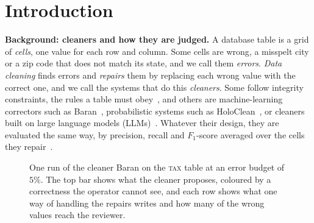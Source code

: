 \documentclass[sigconf, nonacm, balance=false]{acmart}
\theoremstyle{remark}
\begin{document}
\maketitle

\vldbtopmatter

\section{Introduction}
\label{sec:intro}

\textbf{Background: cleaners and how they are judged.} A database table is a grid of
\emph{cells}, one value for each row and column. Some cells are wrong, a misspelt city
or a zip code that does not match its state, and we call them \emph{errors}.
\emph{Data cleaning} finds errors and \emph{repairs} them by replacing each wrong value
with the correct one, and we call the systems that do this \emph{cleaners}. Some follow
integrity constraints, the rules a table must obey~\cite{rahm-2000-cleaning,
10.1561/1900000045, 10.1109/icde.2013.6544847, 10.1145/2463676.2465327}, and others
are machine-learning correctors such as Baran~\cite{10.14778/3407790.3407801},
probabilistic systems such as HoloClean~\cite{10.14778/3137628.3137631}, or cleaners
built on large language models (LLMs)~\cite{10.14778/3574245.3574258,
10.14778/3685800.3685890, 10.1145/3698811}. Whatever their design, they are evaluated
the same way, by precision, recall and $F_1$-score averaged over the cells they
repair~\cite{10.14778/2994509.2994518, 10.14778/3675034.3675051, abdelaal-2023-rein}.

\begin{figure}[t]
  \centering
  \resizebox{\linewidth}{!}{}
  \caption{One run of the cleaner Baran on the \textsc{tax} table at an error budget of
  $5\%$. The top bar shows what the cleaner proposes, coloured by a correctness the
  operator cannot see, and each row shows what one way of handling the repairs writes
  and how many of the wrong values reach the reviewer.}
  \label{fig:problem}
\end{figure}
\end{document}
